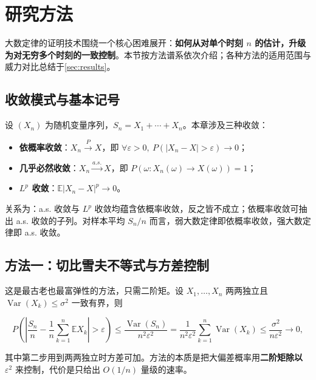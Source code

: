 \section{研究方法}\label{sec:methods}

大数定律的证明技术围绕一个核心困难展开：\textbf{如何从对单个时刻 $n$ 的估计，升级为对无穷多个时刻的一致控制}。本节按方法谱系依次介绍；各种方法的适用范围与威力对比总结于\cref{sec:results}。

\subsection{收敛模式与基本记号}

设 $(X_n)$ 为随机变量序列，$S_n = X_1 + \cdots + X_n$。本章涉及三种收敛：

\begin{itemize}
    \item \textbf{依概率收敛}：$X_n \xrightarrow{P} X$，即 $\forall \varepsilon>0,\ P(|X_n - X| > \varepsilon) \to 0$；
    \item \textbf{几乎必然收敛}：$X_n \xrightarrow{a.s.} X$，即 $P(\omega: X_n(\omega) \to X(\omega)) = 1$；
    \item \textbf{$L^p$ 收敛}：$\mathbb{E}|X_n - X|^p \to 0$。
\end{itemize}

关系为：a.s. 收敛与 $L^p$ 收敛均蕴含依概率收敛，反之皆不成立；依概率收敛可抽出 a.s. 收敛的子列。对样本平均 $S_n/n$ 而言，弱大数定律即依概率收敛，强大数定律即 a.s. 收敛。

\subsection{方法一：切比雪夫不等式与方差控制}

这是最古老也最富弹性的方法，只需二阶矩。设 $X_1, \dots, X_n$ 两两独立且 $\operatorname{Var}(X_k) \leq \sigma^2$ 一致有界，则

\begin{equation}
    P\left(\left|\frac{S_n}{n} - \frac{1}{n}\sum_{k=1}^n \mathbb{E}X_k\right| > \varepsilon\right)
    \leq \frac{\operatorname{Var}(S_n)}{n^2 \varepsilon^2}
    = \frac{1}{n^2\varepsilon^2}\sum_{k=1}^n \operatorname{Var}(X_k)
    \leq \frac{\sigma^2}{n\varepsilon^2} \to 0,
\end{equation}

其中第二步用到两两独立时方差可加。方法的本质是把大偏差概率用\textbf{二阶矩除以 $\varepsilon^2$} 来控制，代价是只给出 $O(1/n)$ 量级的速率。

